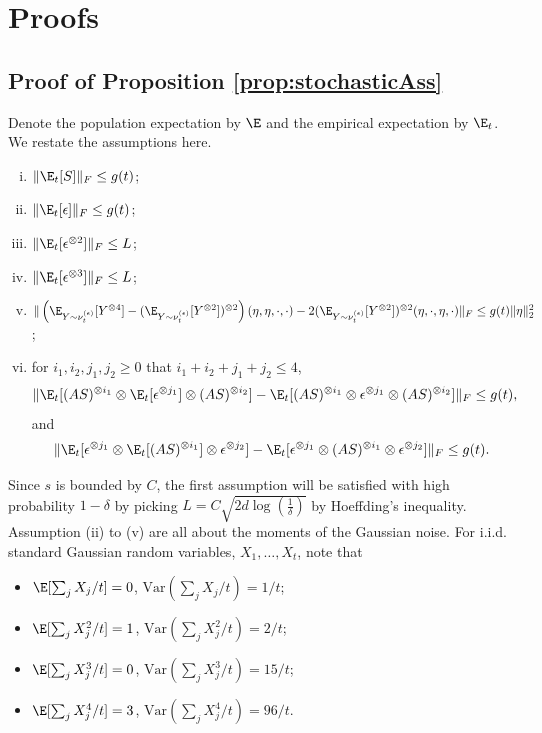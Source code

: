 \section{Proofs}
\label{sec:Appendix}

\subsection{Proof of Proposition \ref{prop:stochasticAss}}
Denote the population expectation by $\E$ and the empirical expectation by $\E_t$. We restate the assumptions here.
\begin{enumerate}[(i).]
\vspace{-3mm}
\item $\| \E_t[S] \|_F\le g(t)$;
\item $\| \E_t[\epsilon] \|_F \le g(t)$;
\item $\| \E_t[\epsilon^{\otimes 2}] \|_F \le L$;
\item $\| \E_t[\epsilon^{\otimes 3}] \|_F \le L$;
\item $\| \left(\E_{Y\sim \nu_t^{(\epsilon)}} [Y^{\otimes4}] - (\E_{Y\sim \nu_t^{(\epsilon)}} [Y^{\otimes2}])^{\otimes 2}\right)(\eta,\eta,\cdot,\cdot)  - 2 (\E_{Y\sim \nu_t^{(\epsilon)}} [Y^{\otimes2}])^{\otimes 2}(\eta,\cdot,\eta,\cdot)\|_F\le g(t) \|\eta\|_2^2$;
\item for $i_1,i_2,j_1,j_2 \ge 0$ that $i_1+i_2+j_1+j_2 \le 4$,  
\begin{align*}
\| \E_t[(AS)^{\otimes i_1} \otimes \E_t[\epsilon^{\otimes j_1}] \otimes (AS)^{\otimes i_2}] - \E_t[(AS)^{\otimes i_1}\otimes \epsilon^{\otimes j_1}\otimes (AS)^{\otimes i_2}]  \|_F \le g(t),
\end{align*}
and 
\begin{align*}
\| \E_t[\epsilon^{\otimes j_1} \otimes \E_t[(AS)^{\otimes i_1}] \otimes \epsilon^{\otimes j_2}] - \E_t[ \epsilon^{\otimes j_1}\otimes (AS)^{\otimes i_1}\otimes \epsilon^{\otimes j_2}]  \|_F \le g(t).
\end{align*}
\end{enumerate}
Since $s$ is bounded by $C$, the first assumption will be satisfied with high probability $1-\delta$ by picking $L = C\sqrt{2d\log(\frac{1}{\delta})}$ by Hoeffding's inequality. Assumption (ii) to (v) are all about the moments of the Gaussian noise. 
For i.i.d. standard Gaussian random variables, $X_1, \ldots, X_t$, note that
\begin{itemize}
\item $ \E[\sum_j X_j/t] = 0$, $\text{Var}(\sum_j X_j/t) = 1/t$;
\item $ \E[\sum_j X_j^2/t] = 1$, $\text{Var}(\sum_j X_j^2/t) = 2/t$;
\item $ \E[\sum_j X_j^3/t] = 0$, $\text{Var}(\sum_j X_j^3/t) = 15/t$;
\item $ \E[\sum_j X_j^4/t] = 3$, $\text{Var}(\sum_j X_j^4/t) = 96/t$.
\end{itemize}
